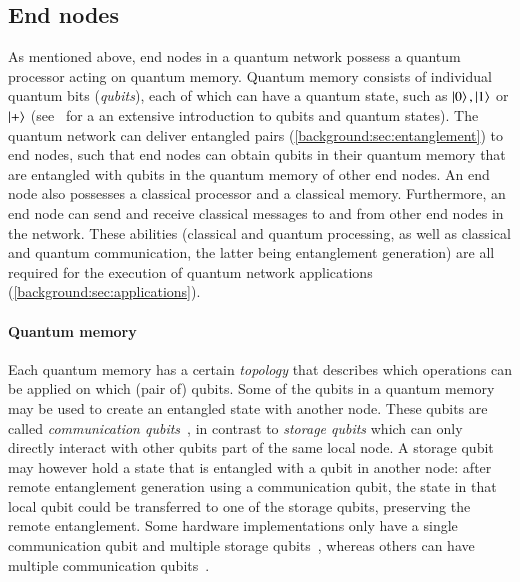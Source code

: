 \subsection{End nodes}
\label{background:sec:end_nodes}

As mentioned above, end nodes in a quantum network possess a quantum processor acting on quantum memory.
Quantum memory consists of individual quantum bits (\emph{qubits}), each of which can have a quantum state, such as $\ket{0}, \ket{1}$ or $\ket{+}$ (see~\cite{nielsen_chuang_2002} for a an extensive introduction to qubits and quantum states).
The quantum network can deliver entangled pairs (\cref{background:sec:entanglement}) to end nodes, such that end nodes can obtain qubits in their quantum memory that are entangled with qubits in the quantum memory of other end nodes.
An end node also possesses a classical processor and a classical memory.
Furthermore, an end node can send and receive classical messages to and from other end nodes in the network.
These abilities (classical and quantum processing, as well as classical and quantum communication, the latter being entanglement generation) are all required for the execution of quantum network applications (\cref{background:sec:applications}).



\paragraph{Quantum memory}
Each quantum memory has a certain \textit{topology} that describes which operations can be applied on which (pair of) qubits.
Some of the qubits in a quantum memory may be used to create an entangled state with another node.
These qubits are called \emph{communication qubits}~\cite{dahlberg2019linklayer}, in contrast to \emph{storage qubits} which can only directly interact with other qubits part of the same local node.
A storage qubit may however hold a state that is entangled with a qubit in another node: after remote entanglement generation using a communication qubit, the state in that local qubit could be transferred to one of the storage qubits, preserving the remote entanglement.
Some hardware implementations only have a single communication qubit and multiple storage qubits~\cite{Bernien2014}, whereas others can have multiple communication qubits~\cite{Inlek2017}.

